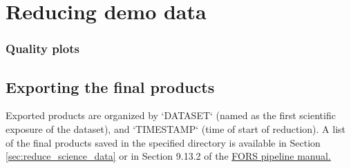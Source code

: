 
\section{Reducing demo data}
\label{sec:reducing_demo_data}



 
\subsubsection{Quality plots}


\subsection{Exporting the final products}
\label{sec:export_final_products}



 
 
Exported products are organized by `DATASET` (named as the first
scientific exposure of the dataset), and `TIMESTAMP` (time of start of
reduction).
 A list of the final products saved in the specified directory is available in Section \ref{sec:reduce_science_data} or in Section 9.13.2 of the \href{
https://ftp.eso.org/pub/dfs/pipelines/instruments/fors/fors-pipeline-manual-5.18.pdf}{
FORS pipeline manual.}

